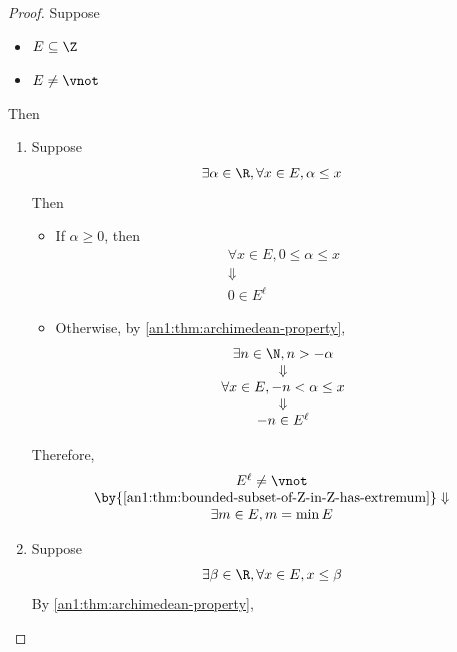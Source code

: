 \begin{proof}
  Suppose
  \begin{itemize}
    \item $E \subseteq \Z$
    \item $E \neq \vnot$
  \end{itemize}
  Then
  \begin{enumerate}[label=\textbf{(\Alph*)}]
    \item Suppose
          \[
            \exists \alpha \in \R, \forall x \in E, \alpha \leq x
          \]
          Then
          \begin{itemize}
            \item If $\alpha \geq 0$, then
                  \[
                    \begin{array}{c}
                      \forall x \in E, 0 \leq \alpha \leq x \\
                      \Downarrow                            \\
                      0 \in E^{\ell}
                    \end{array}
                  \]
            \item Otherwise, by \cref{an1:thm:archimedean-property},
                  \[
                    \begin{array}{c}
                      \exists n \in \N, n > - \alpha       \\
                      \Downarrow                           \\
                      \forall x \in E, - n < \alpha \leq x \\
                      \Downarrow                           \\
                      -n \in E^{\ell}
                    \end{array}
                  \]
          \end{itemize}
          Therefore,
          \[
            \begin{array}{c}
              E^{\ell} \neq \vnot                                                  \\
              \by{\Cref{an1:thm:bounded-subset-of-Z-in-Z-has-extremum}} \Downarrow \\
              \exists m \in E, m = \min E
            \end{array}
          \]
    \item Suppose
          \[
            \exists \beta \in \R, \forall x \in E, x \leq \beta
          \]
          By \cref{an1:thm:archimedean-property},

\end{enumerate}
\end{proof}
